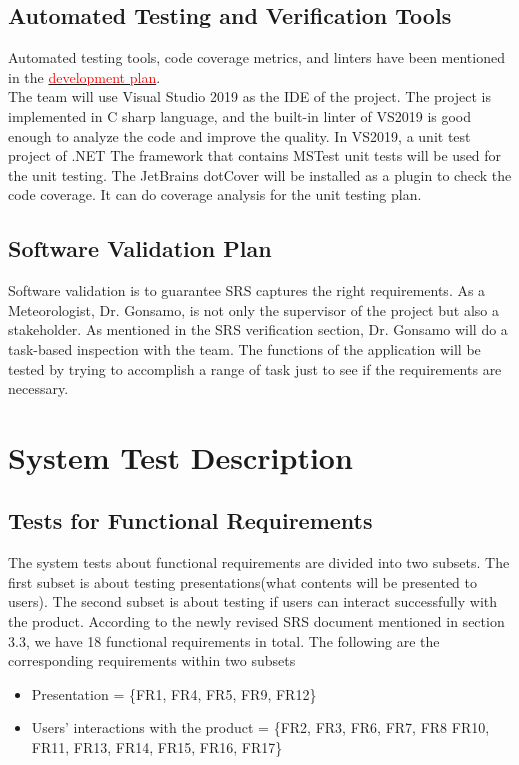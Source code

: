 \documentclass[12pt, titlepage]{article}
\begin{document}
\subsection{Automated Testing and Verification Tools}

Automated testing tools, code coverage metrics, and linters have been mentioned in the
\href{https://github.com/wuj187/DigitalTwinCAS/blob/main/docs/DevelopmentPlan/DevelopmentPlan.pdf}{\textcolor{red}{development plan}}. \\
The team will use Visual Studio 2019 as the IDE of the project. The project is
implemented in C sharp language, and the built-in linter of VS2019 is good enough to
analyze the code and improve the quality. In VS2019, a unit test project of .NET
The framework that contains MSTest unit tests will be used for the unit testing. The
JetBrains dotCover will be installed as a plugin to check the code coverage. It can do
coverage analysis for the unit testing plan.

\subsection{Software Validation Plan}
Software validation is to guarantee SRS captures the right requirements.  As a
Meteorologist, Dr. Gonsamo, is not only the supervisor of the project but also a
stakeholder. As mentioned in the SRS verification section, Dr. Gonsamo will do a task-based inspection with the team. The functions of the application will be tested by trying to accomplish a range of task just to see if the requirements are necessary.

\newpage

\section{System Test Description}
\subsection{Tests for Functional Requirements}
The system tests about functional requirements
are divided into two subsets. The first subset is about 
testing presentations(what
contents will be presented to users). The second subset is about
testing if users can interact successfully with the product.
According to the newly revised SRS document mentioned in section 3.3, we have
18 functional requirements in total. The following are the
corresponding requirements within  two subsets
\begin{itemize}
    \item Presentation = \{FR1, FR4, FR5, FR9, FR12\}
    \item Users' interactions with the product = \{FR2, FR3, FR6, FR7, FR8
    FR10, FR11, FR13, FR14, FR15, FR16, FR17\}
\end{itemize}
\end{document}
